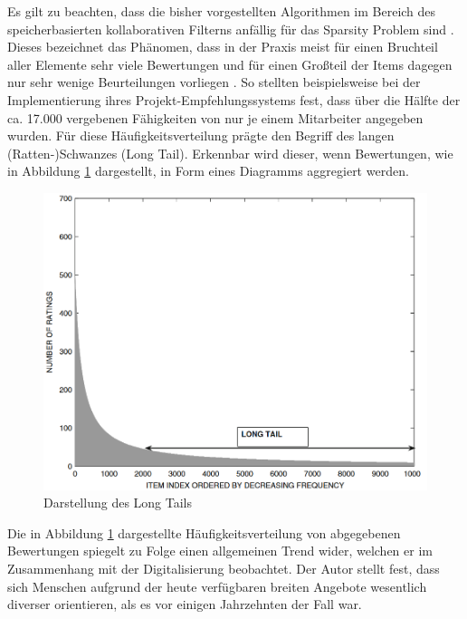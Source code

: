 Es gilt zu beachten, dass die bisher vorgestellten Algorithmen im Bereich des speicherbasierten kollaborativen Filterns anfällig für das Sparsity Problem sind \cite[S. 3f.]{grvcar:2006}. Dieses bezeichnet das Phänomen, dass in der Praxis meist für einen Bruchteil aller Elemente sehr viele Bewertungen und für einen Großteil der Items dagegen nur sehr wenige Beurteilungen vorliegen \cite[S. 8]{recommenderSystems:2016}. So stellten beispielsweise \textcite[S. 3]{mitre:2014} bei der Implementierung ihres Projekt-Empfehlungssystems fest, dass über die Hälfte der ca. 17.000 vergebenen Fähigkeiten von nur je einem Mitarbeiter angegeben wurden.
Für diese Häufigkeitsverteilung prägte \textcite[S. 12]{anderson:2007} den Begriff des langen (Ratten-)Schwanzes (Long Tail). Erkennbar wird dieser, wenn Bewertungen, wie in Abbildung \ref{fig:empfehlungssysteme:cf:speicherbasiert:abb1} dargestellt, in Form eines Diagramms aggregiert werden.

\begin{figure}[h]
	\centering
	\includegraphics[width=1\textwidth]{gfx/long-tail.png}
	\caption{Darstellung des Long Tails \cite[S. 33]{recommenderSystems:2016}}
	\label{fig:empfehlungssysteme:cf:speicherbasiert:abb1}
\end{figure}

Die in Abbildung \ref{fig:empfehlungssysteme:cf:speicherbasiert:abb1} dargestellte Häufigkeitsverteilung von abgegebenen Bewertungen spiegelt \textcite[S. 1ff.]{anderson:2007} zu Folge einen allgemeinen Trend wider, welchen er im Zusammenhang mit der Digitalisierung beobachtet. Der Autor stellt fest, dass sich Menschen aufgrund der heute verfügbaren breiten Angebote wesentlich diverser orientieren, als es vor einigen Jahrzehnten der Fall war.

